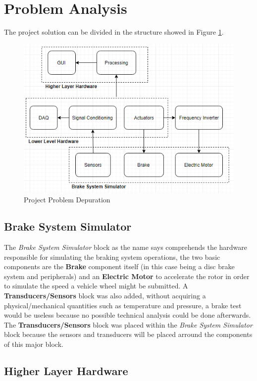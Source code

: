 \section{Problem Analysis}\label{sec:problem-analsysis}

	The project solution can be divided in the structure showed in Figure \ref{fig:projectProblem}.
	
	\begin{figure}[htbp]
		\centering
		\includegraphics[width=.8\textwidth]{figuras/fig-projectProblem}
		\caption{Project Problem Depuration}
		\label{fig:projectProblem}
	\end{figure}
	

	\subsection{Brake System Simulator}\label{ssec:brakeSystemSimulator}
		
		The \textit{Brake System Simulator} block as the name says comprehends the hardware responsible for simulating the braking system operations, the two basic components are the \textbf{Brake} component itself (in this case being a disc brake system and peripherals) and an \textbf{Electric Motor} to accelerate the rotor in order to simulate the speed a vehicle wheel might be submitted. A \textbf{Transducers/Sensors} block was also added, without acquiring a physical/mechanical quantities such as temperature and pressure, a brake test would be useless because no possible technical analysis could be done afterwards. The \textbf{Transducers/Sensors} block was placed within the \textit{Brake System Simulator} block because the sensors and transducers will be placed arround the components of this major block.

	\subsection{Higher Layer Hardware}\label{ssec:higherLayerlHardware}
	
